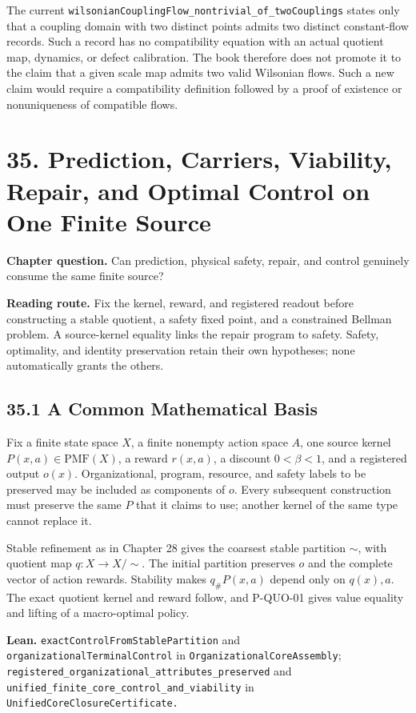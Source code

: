 \documentclass[
  english,
  11pt,
  oneside]{book}
\newcounter{none} %
\begin{document}
The current \nolinkurl{wilsonianCouplingFlow_nontrivial_of_twoCouplings} states only that a coupling domain with two distinct points admits two distinct constant-flow records. Such a record has no compatibility equation with an actual quotient map, dynamics, or defect calibration. The book therefore does not promote it to the claim that a given scale map admits two valid Wilsonian flows. Such a new claim would require a compatibility definition followed by a proof of existence or nonuniqueness of compatible flows.

\chapter{35. Prediction, Carriers, Viability, Repair, and Optimal Control on One Finite Source}\label{ch-35}

\textbf{Chapter question.} Can prediction, physical safety, repair, and control genuinely consume the same finite source?

\textbf{Reading route.} Fix the kernel, reward, and registered readout before constructing a stable quotient, a safety fixed point, and a constrained Bellman problem. A source-kernel equality links the repair program to safety. Safety, optimality, and identity preservation retain their own hypotheses; none automatically grants the others.

\section{35.1 A Common Mathematical Basis}\label{a-common-mathematical-basis}

Fix a finite state space \(X\), a finite nonempty action space \(A\), one source kernel \(P(x,a)\in\mathrm{PMF}(X)\), a reward \(r(x,a)\), a discount \(0<\beta<1\), and a registered output \(o(x)\). Organizational, program, resource, and safety labels to be preserved may be included as components of \(o\). Every subsequent construction must preserve the same \(P\) that it claims to use; another kernel of the same type cannot replace it.

Stable refinement as in Chapter 28 gives the coarsest stable partition \(\sim\), with quotient map \(q:X\to X/{\sim}\). The initial partition preserves \(o\) and the complete vector of action rewards. Stability makes \(q_\#P(x,a)\) depend only on \(q(x),a\). The exact quotient kernel and reward follow, and P-QUO-01 gives value equality and lifting of a macro-optimal policy.

\textbf{Lean.} \nolinkurl{exactControlFromStablePartition} and \nolinkurl{organizationalTerminalControl} in \nolinkurl{OrganizationalCoreAssembly}; \nolinkurl{registered_organizational_attributes_preserved} and \nolinkurl{unified_finite_core_control_and_viability} in \nolinkurl{UnifiedCoreClosureCertificate.}
\end{document}
